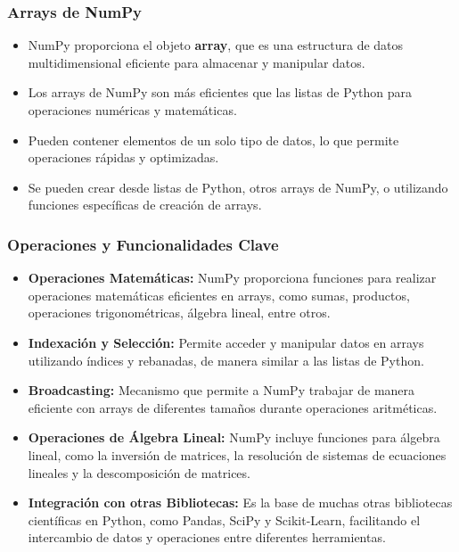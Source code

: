 \documentclass[conference]{IEEEtran}
\begin{document}
    \subsubsection*{Arrays de NumPy}
    \begin{itemize}
      \item NumPy proporciona el objeto \textbf{array}, que es una estructura de datos multidimensional eficiente para almacenar y manipular datos.
      \item Los arrays de NumPy son más eficientes que las listas de Python para operaciones numéricas y matemáticas.
      \item Pueden contener elementos de un solo tipo de datos, lo que permite operaciones rápidas y optimizadas.
      \item Se pueden crear desde listas de Python, otros arrays de NumPy, o utilizando funciones específicas de creación de arrays.
    \end{itemize}
    
    \subsubsection*{Operaciones y Funcionalidades Clave}
    \begin{itemize}
      \item \textbf{Operaciones Matemáticas:}
        NumPy proporciona funciones para realizar operaciones matemáticas eficientes en arrays, como sumas, productos, operaciones trigonométricas, álgebra lineal, entre otros.
      \item \textbf{Indexación y Selección:}
        Permite acceder y manipular datos en arrays utilizando índices y rebanadas, de manera similar a las listas de Python.
      \item \textbf{Broadcasting:}
        Mecanismo que permite a NumPy trabajar de manera eficiente con arrays de diferentes tamaños durante operaciones aritméticas.
      \item \textbf{Operaciones de Álgebra Lineal:}
        NumPy incluye funciones para álgebra lineal, como la inversión de matrices, la resolución de sistemas de ecuaciones lineales y la descomposición de matrices.
      \item \textbf{Integración con otras Bibliotecas:}
        Es la base de muchas otras bibliotecas científicas en Python, como Pandas, SciPy y Scikit-Learn, facilitando el intercambio de datos y operaciones entre diferentes herramientas.
    \end{itemize}
    
\end{document}
